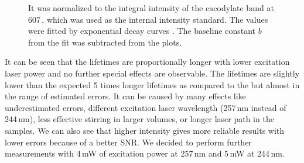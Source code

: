 \begin{figure}
	\centering
	
	\caption[%
		Decrease of the integral intensity of the polyU band at 1231\,\icm{}
		for different excitation laser powers in raw spectra using
		backscattering geometry.%
	]{%
		It was normalized to the integral intensity of the cacodylate band at
		607\,\icm{}, which was used as the internal intensity standard.
		The values were fitted by exponential decay curves
		.
		The baseline constant $b$ from the fit was subtracted from the plots.
	}
	\label{\figlabel{power_optim:hairpins}}
\end{figure}

\begin{table}
	\centering
	
	\caption[%
		Lifetimes of the polyU in dependence on excitation power
		estimated from raw spectra in backscattering geometry.%
	]{%
		$E_0$ are total energies accumulated by detector divided by maximal value
		across all the excitation powers $P$.
	}
	\label{\tablabel{power_optim:lifetimes_hairpins}}
\end{table}

It can be seen that the lifetimes are proportionally longer with lower
excitation laser power and no further special effects are observable.
The lifetimes are slightly lower than the expected 5 times longer lifetimes as
compared to the
but almost in the range of estimated errors.
It can be caused by many effects like underestimated errors, different
excitation laser wavelength (257\,nm instead of 244\,nm), less effective
stirring in larger volumes, or longer laser path in the samples.
We can also see that higher intensity gives more reliable results with
lower errors because of a better SNR.
We decided to perform further measurements with 4\,mW of excitation power at
257\,nm and 5\,mW at 244\,nm.
